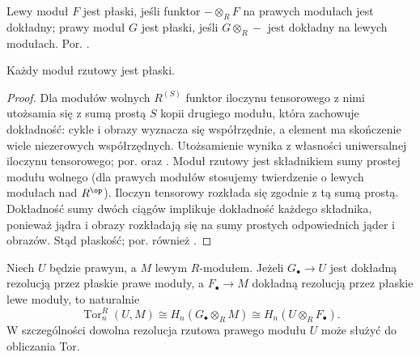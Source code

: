 \begin{definicja}\label{cat:def:flat}
Lewy moduł $F$ jest płaski, jeśli funktor $-\otimes_R F$ na prawych modułach jest dokładny; prawy moduł $G$ jest płaski, jeśli $G\otimes_R-$ jest dokładny na lewych modułach. Por. .
\end{definicja}
\begin{stwierdzenie}\label{cat:prop:projective-flat}
Każdy moduł rzutowy jest płaski.
\end{stwierdzenie}
\begin{proof}
Dla modułów wolnych $R^{(S)}$ funktor iloczynu tensorowego z nimi utożsamia się z sumą prostą $S$ kopii drugiego modułu, która zachowuje dokładność: cykle i obrazy wyznacza się współrzędnie, a element ma skończenie wiele niezerowych współrzędnych. Utożsamienie wynika z własności uniwersalnej iloczynu tensorowego; por.  oraz . Moduł rzutowy jest składnikiem sumy prostej modułu wolnego (dla prawych modułów stosujemy twierdzenie o lewych modułach nad $R^{\op}$). Iloczyn tensorowy rozkłada się zgodnie z tą sumą prostą. Dokładność sumy dwóch ciągów implikuje dokładność każdego składnika, ponieważ jądra i obrazy rozkładają się na sumy prostych odpowiednich jąder i obrazów. Stąd płaskość; por. również .
\end{proof}
\begin{twierdzenie}\label{cat:thm:tor-balanced}
Niech $U$ będzie prawym, a $M$ lewym $R$-modułem. Jeżeli $G_\bullet\to U$ jest dokładną rezolucją przez płaskie prawe moduły, a $F_\bullet\to M$ dokładną rezolucją przez płaskie lewe moduły, to naturalnie
\[
 \operatorname{Tor}_n^R(U,M)\cong H_n(G_\bullet\otimes_R M)
 \cong H_n(U\otimes_R F_\bullet).
\]
W szczególności dowolna rezolucja rzutowa prawego modułu $U$ może służyć do obliczania Tor.
\end{twierdzenie}
